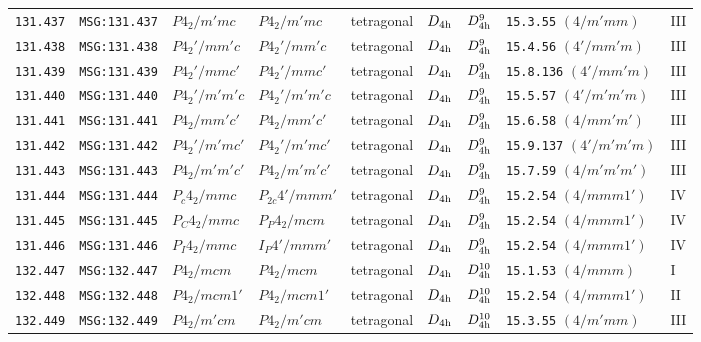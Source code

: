 \documentclass[fleqn,10pt]{jsarticle}
\begin{document}
\begin{center}
\begin{longtable}{lllllllll}
\texttt{131.437} & \texttt{MSG:131.437} & $P4_{2}/m'mc$ & $P4_{2}/m'mc$ & tetragonal & $D_{\rm 4h}$ & $D_{\rm 4h}^{9}$ & \texttt{15.3.55} $(4/m'mm)$ & III \\
\texttt{131.438} & \texttt{MSG:131.438} & $P4_{2}'/mm'c$ & $P4_{2}'/mm'c$ & tetragonal & $D_{\rm 4h}$ & $D_{\rm 4h}^{9}$ & \texttt{15.4.56} $(4'/mm'm)$ & III \\
\texttt{131.439} & \texttt{MSG:131.439} & $P4_{2}'/mmc'$ & $P4_{2}'/mmc'$ & tetragonal & $D_{\rm 4h}$ & $D_{\rm 4h}^{9}$ & \texttt{15.8.136} $(4'/mm'm)$ & III \\
\texttt{131.440} & \texttt{MSG:131.440} & $P4_{2}'/m'm'c$ & $P4_{2}'/m'm'c$ & tetragonal & $D_{\rm 4h}$ & $D_{\rm 4h}^{9}$ & \texttt{15.5.57} $(4'/m'm'm)$ & III \\
\texttt{131.441} & \texttt{MSG:131.441} & $P4_{2}/mm'c'$ & $P4_{2}/mm'c'$ & tetragonal & $D_{\rm 4h}$ & $D_{\rm 4h}^{9}$ & \texttt{15.6.58} $(4/mm'm')$ & III \\
\texttt{131.442} & \texttt{MSG:131.442} & $P4_{2}'/m'mc'$ & $P4_{2}'/m'mc'$ & tetragonal & $D_{\rm 4h}$ & $D_{\rm 4h}^{9}$ & \texttt{15.9.137} $(4'/m'm'm)$ & III \\
\texttt{131.443} & \texttt{MSG:131.443} & $P4_{2}/m'm'c'$ & $P4_{2}/m'm'c'$ & tetragonal & $D_{\rm 4h}$ & $D_{\rm 4h}^{9}$ & \texttt{15.7.59} $(4/m'm'm')$ & III \\
\texttt{131.444} & \texttt{MSG:131.444} & $P_{c}4_{2}/mmc$ & $P_{2c}4'/mmm'$ & tetragonal & $D_{\rm 4h}$ & $D_{\rm 4h}^{9}$ & \texttt{15.2.54} $(4/mmm1')$ & IV \\
\texttt{131.445} & \texttt{MSG:131.445} & $P_{C}4_{2}/mmc$ & $P_{P}4_{2}/mcm$ & tetragonal & $D_{\rm 4h}$ & $D_{\rm 4h}^{9}$ & \texttt{15.2.54} $(4/mmm1')$ & IV \\
\texttt{131.446} & \texttt{MSG:131.446} & $P_{I}4_{2}/mmc$ & $I_{P}4'/mmm'$ & tetragonal & $D_{\rm 4h}$ & $D_{\rm 4h}^{9}$ & \texttt{15.2.54} $(4/mmm1')$ & IV \\ \hline
\texttt{132.447} & \texttt{MSG:132.447} & $P4_{2}/mcm$ & $P4_{2}/mcm$ & tetragonal & $D_{\rm 4h}$ & $D_{\rm 4h}^{10}$ & \texttt{15.1.53} $(4/mmm)$ & I \\
\texttt{132.448} & \texttt{MSG:132.448} & $P4_{2}/mcm1'$ & $P4_{2}/mcm1'$ & tetragonal & $D_{\rm 4h}$ & $D_{\rm 4h}^{10}$ & \texttt{15.2.54} $(4/mmm1')$ & II \\
\texttt{132.449} & \texttt{MSG:132.449} & $P4_{2}/m'cm$ & $P4_{2}/m'cm$ & tetragonal & $D_{\rm 4h}$ & $D_{\rm 4h}^{10}$ & \texttt{15.3.55} $(4/m'mm)$ & III \\

\end{longtable}
\end{center}
\end{document}
